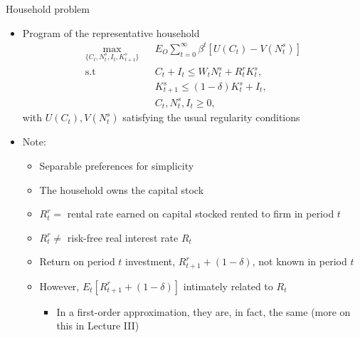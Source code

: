 \documentclass[9pt,xcolor={dvipsnames}]{beamer}
\newcommand{\bit}{\begin{itemize}}
\newcommand{\eit}{\end{itemize}}
\begin{document}
\begin{frame}{Household problem}

\bit
\setlength\itemsep{1.5em}

\item Program of the representative household 
\begin{eqnarray}
\max_{\{C_t, N^s_t, I_{t}, K^s_{t+1}\}} && E_O \sum_{t=0}^{\infty} \beta^t \left[U(C_t)- V(N^s_t) \right]\nonumber \\
\text{s.t} && C_t + I_t \leq W_t N^s_t + R^{r}_t K^s_t, \nonumber \\
&& K^s_{t+1} \leq (1-\delta)K^s_t + I_t,  \nonumber \\
&& C_t, N^s_t, I_t \geq 0, \nonumber
\end{eqnarray}
with $U(C_t), V(N^s_t)$ satisfying the usual regularity conditions 

\item Note:
\bit
\setlength\itemsep{0.5em}
	\item Separable preferences for simplicity

	\item The household owns the capital stock

	\item $R^{r}_t=$ rental rate earned on capital stocked rented to firm in period $t$
	
	\item $R^{r}_t \neq$ risk-free real interest rate $R_t$
	
	\item Return on period $t$ investment, $R^{r}_{t+1}+(1-\delta)$, not known in period $t$
	
	\item However, $E_t \left[R^{r}_{t+1}+(1-\delta)\right]$ intimately related to $R_t$
		\bit
			\item In a first-order approximation, they are, in fact, the same (more on this in Lecture III)
		\eit
\eit


\eit

\end{frame}
\end{document}
